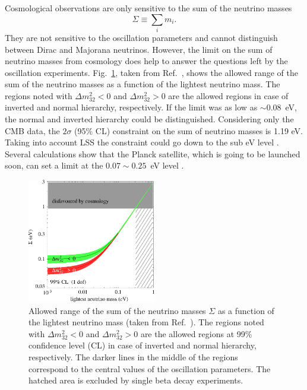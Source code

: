 Cosmological observations are only sensitive to the sum of the neutrino masses
\begin{equation}
  \label{eq:msum}
  \Sigma \equiv \sum_{i}m_{i}.
\end{equation}
They are not sensitive to the oscillation parameters and cannot distinguish between Dirac and Majorana neutrinos. However, the limit on the sum of neutrino masses from cosmology does help to answer the questions left by the oscillation experiments. Fig.~\ref{fig:sumVSlightest}, taken from Ref.~\cite{Str05}, shows the allowed range of the sum of the neutrino masses as a function of the lightest neutrino mass. The regions noted with $\Delta m^{2}_{32}<0$ and $\Delta m^{2}_{32}>0$ are the allowed regions in case of inverted and normal hierarchy, respectively. If the limit was as low as $\sim 0.08$~eV, the normal and inverted hierarchy could be distinguished. Considering only the CMB data, the $2\sigma$ (95\% CL) constraint on the sum of neutrino masses is 1.19 eV. Taking into account LSS the constraint could go down to the sub eV level \cite{Fog08}. Several calculations show that the Planck satellite, which is going to be launched soon, can set a limit at the $0.07 \sim 0.25$~eV level \cite{Pla05}.
\begin{figure}[tbhp]
\centering
\includegraphics[width=0.5\textwidth]{sumVSlightest}  
\caption{Allowed range of the sum of the neutrino masses $\Sigma$ as a function of the lightest neutrino mass (taken from Ref.~\cite{Str05}). The regions noted with $\Delta m^{2}_{32}<0$ and $\Delta m^{2}_{32}>0$ are the allowed regions at 99\% confidence level
(CL) in case of inverted and normal hierarchy, respectively. The darker lines in the middle of the regions correspond to the central values of the oscillation parameters.  The hatched area is excluded by single beta decay experiments.}
\label{fig:sumVSlightest}
\end{figure}

